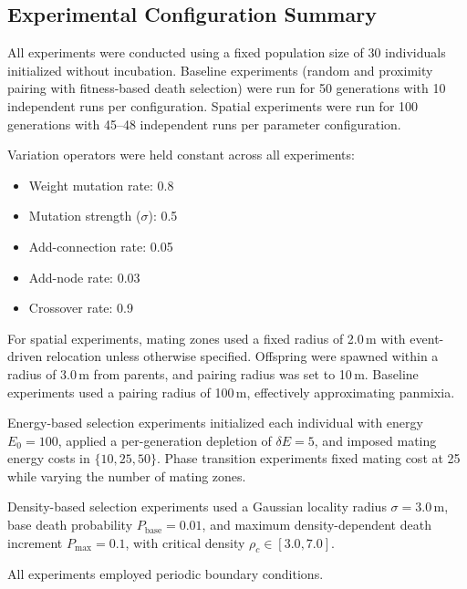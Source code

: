 \documentclass[dvipsnames,format=sigconf,anonymous=false,review=false]{acmart}
\begin{document}
\subsection{Experimental Configuration Summary}

All experiments were conducted using a fixed population size of 30 individuals initialized without incubation. Baseline experiments (random and proximity pairing with fitness-based death selection) were run for 50 generations with 10 independent runs per configuration. Spatial experiments were run for 100 generations with 45--48 independent runs per parameter configuration.

Variation operators were held constant across all experiments:

\begin{itemize}
    \item Weight mutation rate: 0.8
    \item Mutation strength ($\sigma$): 0.5
    \item Add-connection rate: 0.05
    \item Add-node rate: 0.03
    \item Crossover rate: 0.9
\end{itemize}

For spatial experiments, mating zones used a fixed radius of 2.0\,m with event-driven relocation unless otherwise specified. Offspring were spawned within a radius of 3.0\,m from parents, and pairing radius was set to 10\,m. Baseline experiments used a pairing radius of 100\,m, effectively approximating panmixia.

Energy-based selection experiments initialized each individual with energy $E_0 = 100$, applied a per-generation depletion of $\delta E = 5$, and imposed mating energy costs in $\{10, 25, 50\}$. Phase transition experiments fixed mating cost at 25 while varying the number of mating zones.

Density-based selection experiments used a Gaussian locality radius $\sigma = 3.0$\,m, base death probability $P_{\text{base}} = 0.01$, and maximum density-dependent death increment $P_{\text{max}} = 0.1$, with critical density $\rho_c \in [3.0, 7.0]$.

All experiments employed periodic boundary conditions.
\end{document}
